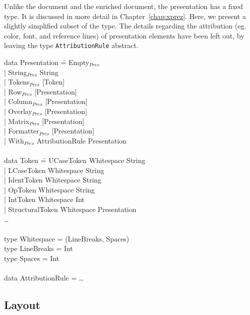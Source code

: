 Unlike the document and the enriched document, the presentation has a fixed type. It is discussed in more detail in Chapter~\ref{chap:xprez}. Here, we present a slightly simplified subset of the type. The details regarding the attribution (eg. color, font, and reference lines) of presentation elements have been left out, by leaving the type \verb|AttributionRule| abstract. 

\noindent
\ttfamily
\begin{tabbing}
data Presentation \= = Empty$_{Pres}$\\
                  \> | String$_{Pres}$ String \\
                  \> | Tokens$_{Pres}$ [Token]\\
                  \> | Row$_{Pres}$ [Presentation]\\
                  \> | Column$_{Pres}$ [Presentation]\\
                  \> | Overlay$_{Pres}$ [Presentation]\\
                  \> | Matrix$_{Pres}$ [Presentation]\\
                  \> | Formatter$_{Pres}$ [Presentation]\\
                  \> | With$_{Pres}$ AttributionRule Presentation\\
\\
data Token \= = UCaseToken Whitespace String\\
           \> | LCaseToken Whitespace String\\
           \> | IdentToken Whitespace String\\
           \> | OpToken Whitespace String\\
           \> | IntToken Whitespace Int\\
           \> | StructuralToken Whitespace Presentation\\
           \> \dots \\
\\
type Whitespace = (LineBreaks, Spaces)\\
type LineBreaks = Int\\
type Spaces = Int\\
\\
data AttributionRule = \dots\\
\end{tabbing}
\rmfamily


%																
\subsection{Layout}

